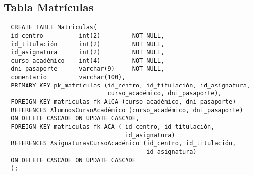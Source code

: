 \subsection{Tabla Matrículas}

\begin{verbatim}
  CREATE TABLE Matriculas(
  id_centro          int(2)         NOT NULL,
  id_titulación      int(2)         NOT NULL,
  id_asignatura      int(2)         NOT NULL,
  curso_académico    int(4)         NOT NULL,
  dni_pasaporte      varchar(9)     NOT NULL,
  comentario         varchar(100),
  PRIMARY KEY pk_matriculas (id_centro, id_titulación, id_asignatura,
                             curso_académico, dni_pasaporte),
  FOREIGN KEY matriculas_fk_AlCA (curso_académico, dni_pasaporte)
  REFERENCES AlumnosCursoAcadémico (curso_académico, dni_pasaporte)
  ON DELETE CASCADE ON UPDATE CASCADE,
  FOREIGN KEY matriculas_fk_ACA ( id_centro, id_titulación,
                                  id_asignatura)
  REFERENCES AsignaturasCursoAcadémico (id_centro, id_titulación,
                                        id_asignatura)
  ON DELETE CASCADE ON UPDATE CASCADE
  );
\end{verbatim}